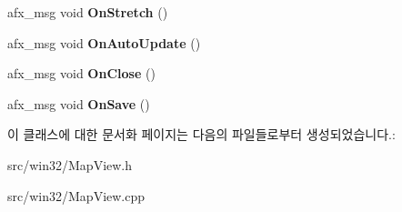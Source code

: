 \begin{DoxyCompactItemize}
afx\+\_\+msg void {\bfseries On\+Stretch} ()
\item 
\mbox{\label{class_map_view_ace8d1802d7e8ae5bd92e572b9c0c84df}} 
afx\+\_\+msg void {\bfseries On\+Auto\+Update} ()
\item 
\mbox{\label{class_map_view_a4831981d7411a8a37353679421517cf8}} 
afx\+\_\+msg void {\bfseries On\+Close} ()
\item 
\mbox{\label{class_map_view_a3fc9d61706da44e2fd3e8762805d9f0b}} 
afx\+\_\+msg void {\bfseries On\+Save} ()
\end{DoxyCompactItemize}


이 클래스에 대한 문서화 페이지는 다음의 파일들로부터 생성되었습니다.\+:\begin{DoxyCompactItemize}
\item 
src/win32/Map\+View.\+h\item 
src/win32/Map\+View.\+cpp\end{DoxyCompactItemize}
